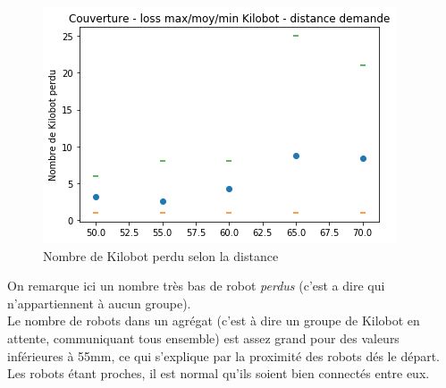 \documentclass[a4paper]{article}
\begin{document}
\begin{figure}[h!]
	\centering
	\begin{minipage}[c]{.46\linewidth}
		\centering
		\includegraphics[width=1.1\linewidth]{../../script_results/Couverture_loss_kilobot_groupe.png}
		\caption{Nombre de Kilobot perdu selon la distance}
	\end{minipage}
\end{figure}
On remarque ici un nombre très bas de robot \textit{perdus} (c'est a dire qui n'appartiennent à aucun groupe). \\Le nombre de robots dans un agrégat (c'est à dire un groupe de Kilobot en attente, communiquant tous ensemble) est assez grand pour des valeurs inférieures à 55mm, ce qui s'explique par la proximité des robots dés le départ. Les robots étant proches, il est normal qu'ils soient bien connectés entre eux.
\end{document}
